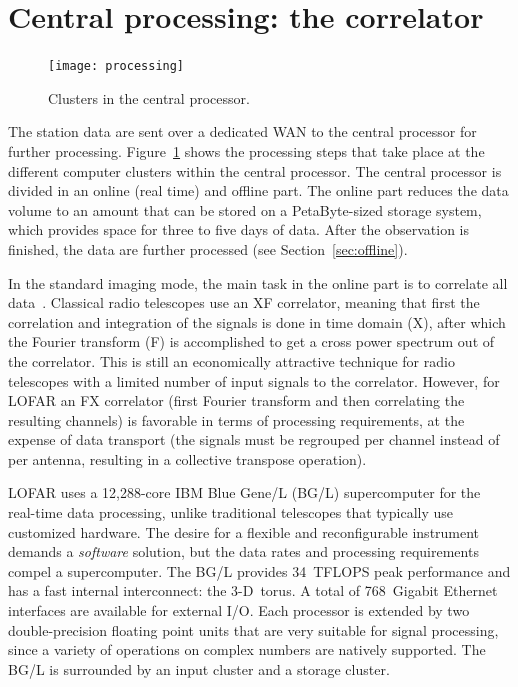 \documentclass[journal]{IEEEtran}
\begin{document}
\section{Central processing: the correlator}
\label{sec:corr}

\begin{figure}
\begin{center}
\texttt{[image: processing]}
\end{center}
\caption{Clusters in the central processor.}
\label{fig:CEP}
\end{figure}

The station data are sent over a dedicated WAN to the central processor for
further processing.
Figure~\ref{fig:CEP} shows the processing steps that take place at the
different computer clusters within the central processor.
The central processor is divided in an online (real time) and offline part.
The online part reduces the data volume to an amount that can be stored on
a PetaByte-sized storage system, which provides space for three to five days
of data.
After the observation is finished, the data are further processed (see
Section~\ref{sec:offline}).

In the standard imaging mode, the main task in the online part is to
correlate all data~\cite{Romein:06}.
Classical radio telescopes use an XF correlator, meaning that first the
correlation and integration of the signals is done in time domain (X),
after which the Fourier transform (F) is accomplished to get a cross power
spectrum out of the correlator.
This is still an economically attractive technique for radio telescopes with
a limited number of input signals to the correlator.
However, for LOFAR an FX correlator (first Fourier transform and then
correlating the resulting channels) is favorable in terms of processing
requirements, at the expense of data transport (the signals must be regrouped
per channel instead of per antenna, resulting in a collective transpose
operation).

LOFAR uses a 12,288-core IBM Blue Gene/L (BG/L) supercomputer for the real-time
data processing,
unlike traditional telescopes that typically use customized hardware.
The desire for a flexible and reconfigurable instrument demands a
{\em software\/} solution, but the data rates and processing requirements
compel a supercomputer.
The BG/L provides 34~TFLOPS peak performance and has a fast internal
interconnect: the 3-D~torus.
A total of 768~Gigabit Ethernet interfaces are available for external I/O.
Each processor is extended by two double-precision floating point units
that are very suitable for signal processing, since a variety of operations
on complex numbers are natively supported.
The BG/L is surrounded by an input cluster and a storage cluster.
\end{document}
